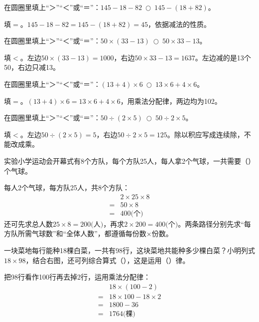 在圆圈里填上“＞”“＜”或“＝”：\(145-18-82\ \bigcirc\ 145-(18+82)\)。\par
\begin{BookAnswer}
填\(=\)。\(145-18-82=145-(18+82)=45\)，依据减法的性质。
\end{BookAnswer}

在圆圈里填上“＞”“＜”或“＝”：\(50\times(33-13)\ \bigcirc\ 50\times33-13\)。\par
\begin{BookAnswer}
填\(<\)。左边\(50\times(33-13)=1000\)，右边\(50\times33-13=1637\)。左边减的是13个50，右边只减13。
\end{BookAnswer}

在圆圈里填上“＞”“＜”或“＝”：\((13+4)\times6\ \bigcirc\ 13\times6+4\times6\)。\par
\begin{BookAnswer}
填\(=\)。\((13+4)\times6=13\times6+4\times6\)，用乘法分配律，两边均为102。
\end{BookAnswer}

在圆圈里填上“＞”“＜”或“＝”：\(50\div(2\times5)\ \bigcirc\ 50\div2\times5\)。\par
\begin{BookAnswer}
填\(<\)。左边\(50\div(2\times5)=5\)，右边\(50\div2\times5=125\)。除以积应写成连续除，不能改成乘。
\end{BookAnswer}

实验小学运动会开幕式有8个方队，每个方队25人，每人拿2个气球，一共需要（\hspace{1.8em}）个气球。\par
\begin{BookAnswer}
每人2个气球，每方队25人，共8个方队：\[\begin{aligned} &2\times25\times8\\={}&50\times8\\={}&400\text{(个)}\end{aligned}\]还可先求总人数\(25\times8=200\text{(人)}\)，再求\(2\times200=400\text{(个)}\)。两条路径分别先求“每方队所需气球数”和“全体人数”，都遵循每份数×份数。
\end{BookAnswer}

一块菜地每行能种18棵白菜，一共有98行，这块菜地共能种多少棵白菜？小明列式\(18\times98\)，结合右图，还可列综合算式（\hspace{1.8em}），这是运用（\hspace{1.8em}）律。\par
{}
\begin{BookAnswer}
把98行看作100行再去掉2行，运用乘法分配律：\[\begin{aligned} &18\times(100-2)\\={}&18\times100-18\times2\\={}&1800-36\\={}&1764\text{(棵)}\end{aligned}\]
\end{BookAnswer}


